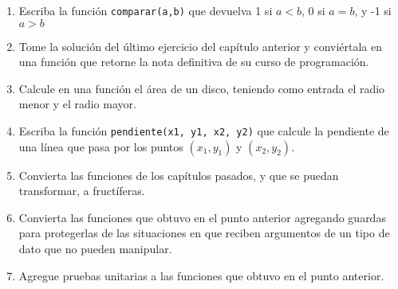 \begin{enumerate}

 \item Escriba la función \verb+comparar(a,b)+ que devuelva 1 si $a<b$, 0 si $a=b$, y -1 si $a>b$
 
 \item Tome la solución del último ejercicio del capítulo anterior y conviértala en una función que retorne la nota 
 definitiva de su curso de programación.
 
 \item Calcule en una función el área de un disco, teniendo como entrada el radio menor y el radio mayor.
 
 \item Escriba la función \verb+pendiente(x1, y1, x2, y2)+ que calcule la pendiente de una línea que pasa por los puntos 
 $(x_1, y_1)$ y $(x_2, y_2)$. 
 
 \item Convierta las funciones de los capítulos pasados, y que se puedan transformar, a fructíferas.
 
 \item Convierta las funciones que obtuvo en el punto anterior agregando guardas para protegerlas de las situaciones
 en que reciben argumentos de un tipo de dato que no pueden manipular.
 
 \item Agregue pruebas unitarias a las funciones que obtuvo en el punto anterior.
 
\end{enumerate}